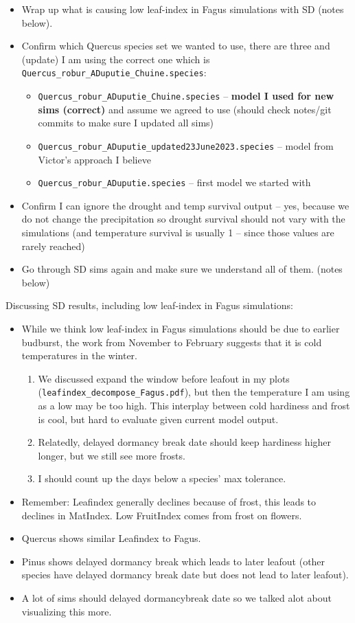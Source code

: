 \documentclass[11pt,letter]{article}
\begin{document}
\begin{itemize}
\item Wrap up what is causing low leaf-index in Fagus simulations with SD (notes below).
\item Confirm which Quercus species set we wanted to use, there are three and (update) I am using the correct one which is \verb|Quercus_robur_ADuputie_Chuine.species|:
\begin{itemize}
\item \verb|Quercus_robur_ADuputie_Chuine.species| -- {\bf model I used for new sims (correct)} and assume we agreed to use (should check notes/git commits to make sure I updated all sims)
\item \verb|Quercus_robur_ADuputie_updated23June2023.species| -- model from Victor's approach I believe
\item \verb|Quercus_robur_ADuputie.species| -- first model we started with
\end{itemize}
\item Confirm I can ignore the drought and temp survival output -- yes, because we do not change the precipitation so drought survival should not vary with the simulations (and temperature survival is usually 1 -- since those values are rarely reached)
\item Go through SD sims again and make sure we understand all of them. (notes below)
\end{itemize}

Discussing SD results, including low leaf-index in Fagus simulations:
\begin{itemize}
\item While we think low leaf-index in Fagus simulations should be due to earlier budburst, the work from November to February suggests that it is cold temperatures in the winter. 
\begin{enumerate}
\item We discussed expand the window before leafout in my plots (\verb|leafindex_decompose_Fagus.pdf|), but then the temperature I am using as a low may be too high. This interplay between cold hardiness and frost is cool, but hard to evaluate given current model output.
\item Relatedly, delayed dormancy break date should keep hardiness higher longer, but we still see more frosts. 
\item I should count up the days below a species' max tolerance.
\end{enumerate}
\item Remember: Leafindex generally declines because of frost, this leads to declines in MatIndex. Low FruitIndex comes from frost on flowers.
\item Quercus shows similar Leafindex to Fagus.
\item Pinus shows delayed dormancy break which leads to later leafout (other species have delayed dormancy break date but does not lead to later leafout). 
\item A lot of sims should delayed dormancybreak date so we talked alot about visualizing this more. 
\end{itemize}
\end{document}
